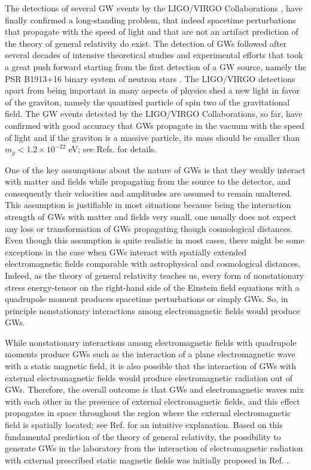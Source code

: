 \documentclass[a4paper,11pt]{article}
\begin{document}
The detections of several GW events by the LIGO/VIRGO Collaborations \cite{Abbott:2016blz}, have finally confirmed a long-standing problem, that indeed spacetime perturbations that propagate with the speed of light and that are not an artifact prediction of the theory of general relativity do exist. The detection of GWs followed after several decades of intensive theoretical studies and experimental efforts that took a great push forward starting from the first detection of a GW source, namely the PSR B1913+16 binary system of neutron stars \cite{Hulse:1974eb}.  The LIGO/VIRGO detections apart from being important in many aspects of physics shed a new light in favor of the graviton, namely the quantized particle of spin two of the gravitational field. The GW events detected by the LIGO/VIRGO Collaborations, so far, have confirmed with good accuracy that GWs propagate in the vacuum with the speed of light and if the graviton is a massive particle, its mass should be smaller than $m_g<1.2\times 10^{-22}$ eV; see Refs. \cite{Abbott:2016blz} for details. 


 
One of the key assumptions about the nature of GWs is that they weakly interact with matter and fields while propagating from the source to the detector, and consequently their velocities and amplitudes are assumed to remain unaltered. This assumption is justifiable in most situations because being the interaction strength of GWs with matter and fields very small, one usually does not expect any loss or transformation of GWs propagating though cosmological distances. Even though this assumption is quite realistic in most cases, there might be some exceptions in the case when GWs interact with spatially extended electromagnetic fields comparable with astrophysical and cosmological distances. Indeed, as the theory of general relativity teaches us, every form of nonstationary stress energy-tensor on the right-hand side of the Einstein field equations with a quadrupole moment produces spacetime perturbations or simply GWs.  So, in principle nonstationary interactions among electromagnetic fields would produce GWs.

While nonstationary interactions among electromagnetic fields with quadrupole moments produce GWs such as the interaction of a plane electromagnetic wave with a static magnetic field, it is also possible that the interaction of GWs with external electromagnetic fields would produce electromagnetic radiation out of GWs. Therefore, the overall outcome is that GWs and electromagnetic waves mix with each other in the presence of external electromagnetic fields, and this effect propagates in space throughout the region where the external electromagnetic field is spatially located; see Ref. \cite{Ejlli:2013gaa} for an intuitive explanation. 
Based on this fundamental prediction of the theory of general relativity, the possibility to generate GWs in the laboratory from the interaction of electromagnetic radiation with external prescribed static magnetic fields was initially proposed in Ref.  \cite{gertsen61}. 
 
\end{document}

